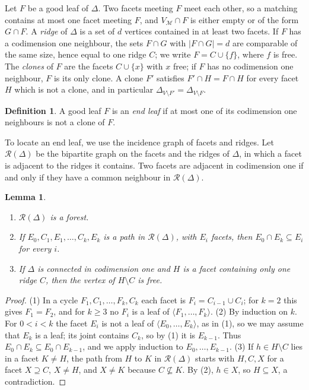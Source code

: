 \documentclass{amsart}
\newtheorem{Lemma}[Theorem]{Lemma}
\theoremstyle{definition}
\newtheorem{Definition}[Theorem]{Definition}
\theoremstyle{remark}
\begin{document}

Let $F$ be a good leaf of $\Delta$. Two facets meeting $F$ meet each other, so a matching contains at most one facet meeting $F$, and $V_{\mathcal M}\cap F$ is either empty or of the form $G\cap F$. A \emph{ridge} of $\Delta$ is a set of $d$ vertices contained in at least two facets. If $F$ has a codimension one neighbour, the sets $F\cap G$ with $|F\cap G|=d$ are comparable of the same size, hence equal to one ridge $C$; we write $F=C\cup\{f\}$, where $f$ is free. The \emph{clones} of $F$ are the facets $C\cup\{x\}$ with $x$ free; if $F$ has no codimension one neighbour, $F$ is its only clone. A clone $F'$ satisfies $F'\cap H=F\cap H$ for every facet $H$ which is not a clone, and in particular $\Delta_{V\setminus F'}=\Delta_{V\setminus F}$.

\begin{Definition}\label{def:end-leaf}
A good leaf $F$ is an \emph{end leaf} if at most one of its codimension one neighbours is not a clone of $F$.
\end{Definition}



To locate an end leaf, we use the incidence graph of facets and ridges. Let $\mathcal R(\Delta)$ be the bipartite graph on the facets and the ridges of $\Delta$, in which a facet is adjacent to the ridges it contains. Two facets are adjacent in codimension one if and only if they have a common neighbour in $\mathcal R(\Delta)$.

\begin{Lemma}\label{lem:ridge-graph}
\begin{enumerate}
\item $\mathcal R(\Delta)$ is a forest.
\item If $E_0,C_1,E_1,\ldots,C_k,E_k$ is a path in $\mathcal R(\Delta)$, with $E_i$ facets, then $E_0\cap E_k\subseteq E_i$ for every $i$.
\item If $\Delta$ is connected in codimension one and $H$ is a facet containing only one ridge $C$, then the vertex of $H\setminus C$ is free.
\end{enumerate}
\end{Lemma}

\begin{proof}
(1) In a cycle $F_1,C_1,\ldots,F_k,C_k$ each facet is $F_i=C_{i-1}\cup C_i$; for $k=2$ this gives $F_1=F_2$, and for $k\geq 3$ no $F_i$ is a leaf of $\langle F_1,\ldots,F_k\rangle$. (2) By induction on $k$. For $0<i<k$ the facet $E_i$ is not a leaf of $\langle E_0,\ldots,E_k\rangle$, as in (1), so we may assume that $E_k$ is a leaf; its joint contains $C_k$, so by (1) it is $E_{k-1}$. Thus $E_0\cap E_k\subseteq E_0\cap E_{k-1}$, and we apply induction to $E_0,\ldots,E_{k-1}$. (3) If $h\in H\setminus C$ lies in a facet $K\neq H$, the path from $H$ to $K$ in $\mathcal R(\Delta)$ starts with $H,C,X$ for a facet $X\supseteq C$, $X\neq H$, and $X\neq K$ because $C\not\subseteq K$. By (2), $h\in X$, so $H\subseteq X$, a contradiction.
\end{proof}
\end{document}
